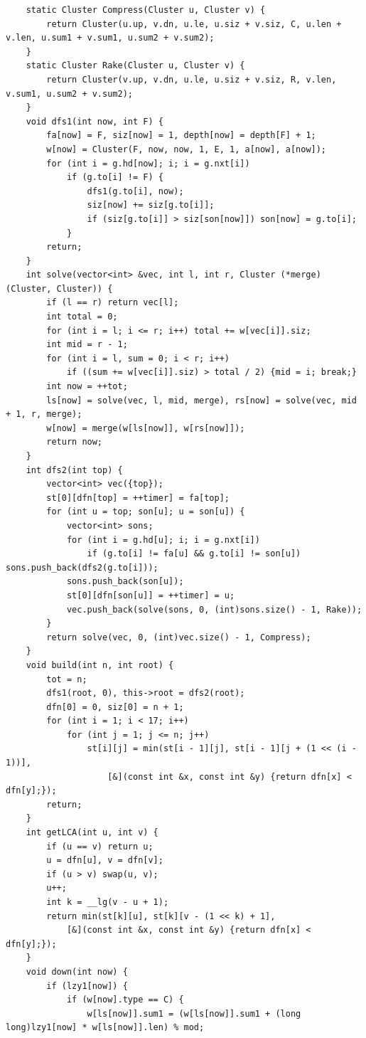 \begin{verbatim}
    static Cluster Compress(Cluster u, Cluster v) {
        return Cluster(u.up, v.dn, u.le, u.siz + v.siz, C, u.len + v.len, u.sum1 + v.sum1, u.sum2 + v.sum2);
    }
    static Cluster Rake(Cluster u, Cluster v) {
        return Cluster(v.up, v.dn, u.le, u.siz + v.siz, R, v.len, v.sum1, u.sum2 + v.sum2);
    }
    void dfs1(int now, int F) {
        fa[now] = F, siz[now] = 1, depth[now] = depth[F] + 1;
        w[now] = Cluster(F, now, now, 1, E, 1, a[now], a[now]);
        for (int i = g.hd[now]; i; i = g.nxt[i])
            if (g.to[i] != F) {
                dfs1(g.to[i], now);
                siz[now] += siz[g.to[i]];
                if (siz[g.to[i]] > siz[son[now]]) son[now] = g.to[i];
            }
        return;
    }
    int solve(vector<int> &vec, int l, int r, Cluster (*merge)(Cluster, Cluster)) {
        if (l == r) return vec[l];
        int total = 0;
        for (int i = l; i <= r; i++) total += w[vec[i]].siz;
        int mid = r - 1;
        for (int i = l, sum = 0; i < r; i++)
            if ((sum += w[vec[i]].siz) > total / 2) {mid = i; break;}
        int now = ++tot;
        ls[now] = solve(vec, l, mid, merge), rs[now] = solve(vec, mid + 1, r, merge);
        w[now] = merge(w[ls[now]], w[rs[now]]);
        return now;
    }
    int dfs2(int top) {
        vector<int> vec({top});
        st[0][dfn[top] = ++timer] = fa[top];
        for (int u = top; son[u]; u = son[u]) {
            vector<int> sons;
            for (int i = g.hd[u]; i; i = g.nxt[i])
                if (g.to[i] != fa[u] && g.to[i] != son[u]) sons.push_back(dfs2(g.to[i]));
            sons.push_back(son[u]);
            st[0][dfn[son[u]] = ++timer] = u;
            vec.push_back(solve(sons, 0, (int)sons.size() - 1, Rake));
        }
        return solve(vec, 0, (int)vec.size() - 1, Compress);
    }
    void build(int n, int root) {
        tot = n;
        dfs1(root, 0), this->root = dfs2(root);
        dfn[0] = 0, siz[0] = n + 1;
        for (int i = 1; i < 17; i++)
            for (int j = 1; j <= n; j++)
                st[i][j] = min(st[i - 1][j], st[i - 1][j + (1 << (i - 1))],
                    [&](const int &x, const int &y) {return dfn[x] < dfn[y];});
        return;
    }
    int getLCA(int u, int v) {
        if (u == v) return u;
        u = dfn[u], v = dfn[v];
        if (u > v) swap(u, v);
        u++;
        int k = __lg(v - u + 1);
        return min(st[k][u], st[k][v - (1 << k) + 1],
            [&](const int &x, const int &y) {return dfn[x] < dfn[y];});
    }
    void down(int now) {
        if (lzy1[now]) {
            if (w[now].type == C) {
                w[ls[now]].sum1 = (w[ls[now]].sum1 + (long long)lzy1[now] * w[ls[now]].len) % mod;

\end{verbatim}

